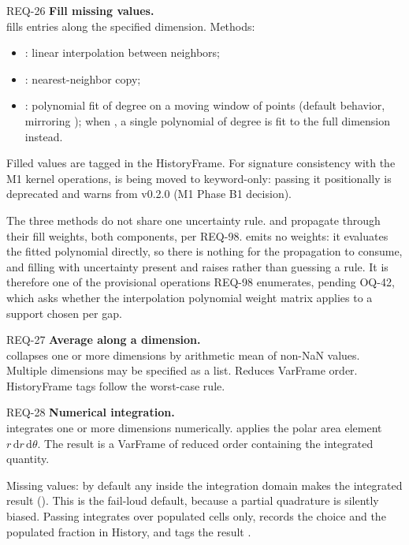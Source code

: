 \begin{reqbox}{REQ-26}{\stable}
\textbf{Fill missing values.}\\
 fills  entries along the specified
dimension. Methods:
\begin{itemize}[noitemsep,topsep=2pt]
  \item {}: linear interpolation between neighbors;
  \item {}: nearest-neighbor copy;
  \item {}: polynomial fit of degree  on a
    moving window of  points (default behavior, mirroring
    ); when , a single polynomial of
    degree  is fit to the full dimension instead.
\end{itemize}
Filled values are tagged  in the HistoryFrame. For
signature consistency with the M1 kernel operations, 
is being moved to keyword-only: passing it positionally is deprecated
and warns from v0.2.0 (M1 Phase B1 decision).

The three methods do not share one uncertainty rule. 
and  propagate through their fill weights, both
components, per REQ-98.  emits no weights: it evaluates
the fitted polynomial directly, so there is nothing for the propagation
to consume, and filling with uncertainty present and
 raises  rather than
guessing a rule. It is therefore one of the provisional operations
REQ-98 enumerates, pending OQ-42, which asks whether the interpolation
polynomial weight matrix applies to a support chosen per gap.
\end{reqbox}

\begin{reqbox}{REQ-27}{\stable}
\textbf{Average along a dimension.}\\
 collapses one or more dimensions by arithmetic
mean of non-NaN values. Multiple dimensions may be specified as a list.
Reduces VarFrame order. HistoryFrame tags follow the worst-case rule.
\end{reqbox}

\begin{reqbox}{REQ-28}{\stable}
\textbf{Numerical integration.}\\
 integrates one or more
dimensions numerically.  applies the polar area
element $r\,\mathrm{d}r\,\mathrm{d}\theta$. The result is a VarFrame of
reduced order containing the integrated quantity.

Missing values: by default any  inside the integration domain
makes the integrated result  (). This is
the fail-loud default, because a partial quadrature is silently biased.
Passing  integrates over populated cells only, records
the choice and the populated fraction in History, and tags the result
.
\end{reqbox}


